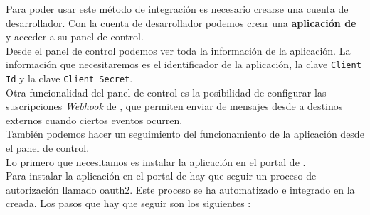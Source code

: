 Para poder usar este método de integración es necesario crearse una cuenta de desarrollador. Con la cuenta de desarrollador podemos crear una \textbf{aplicación de \hs{}} y acceder a su panel de control.\\ 

Desde el panel de control podemos ver toda la información de la aplicación. La información que necesitaremos es el identificador de la aplicación, la clave \texttt{Client Id} y la clave \texttt{Client Secret}.\\

Otra funcionalidad del panel de control es la posibilidad de configurar las suscripciones \textit{Webhook} de \hs{}, que permiten enviar de mensajes desde \hs{} a destinos externos cuando ciertos eventos ocurren.\\

También podemos hacer un seguimiento del funcionamiento de la aplicación desde el panel de control.\\

Lo primero que necesitamos es instalar la aplicación en el portal de \hs{}.\\

Para instalar la aplicación en el portal de \hs{} hay que seguir un proceso de autorización llamado \gls{oauth2}. Este proceso se ha automatizado e integrado en la \iface{} creada. 
Los pasos que hay que seguir son los siguientes \cite{hsapi}:

